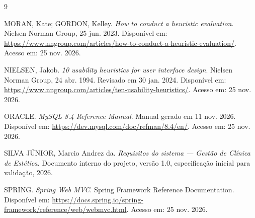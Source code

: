 \documentclass[12pt,a4paper]{article}
\begin{document}
\begin{thebibliography}{9}

MORAN, Kate; GORDON, Kelley. \textit{How to conduct a heuristic evaluation}. Nielsen Norman Group, 25 jun. 2023. Disponível em: \url{https://www.nngroup.com/articles/how-to-conduct-a-heuristic-evaluation/}. Acesso em: 25 nov. 2026.

NIELSEN, Jakob. \textit{10 usability heuristics for user interface design}. Nielsen Norman Group, 24 abr. 1994. Revisado em 30 jan. 2024. Disponível em: \url{https://www.nngroup.com/articles/ten-usability-heuristics/}. Acesso em: 25 nov. 2026.

ORACLE. \textit{MySQL 8.4 Reference Manual}. Manual gerado em 11 nov. 2026. Disponível em: \url{https://dev.mysql.com/doc/refman/8.4/en/}. Acesso em: 25 nov. 2026.

SILVA JÚNIOR, Marcio Andrez da. \textit{Requisitos do sistema --- Gestão de Clínica de Estética}. Documento interno do projeto, versão 1.0, especificação inicial para validação, 2026.

SPRING. \textit{Spring Web MVC}. Spring Framework Reference Documentation. Disponível em: \url{https://docs.spring.io/spring-framework/reference/web/webmvc.html}. Acesso em: 25 nov. 2026.

\end{thebibliography}
\end{document}
